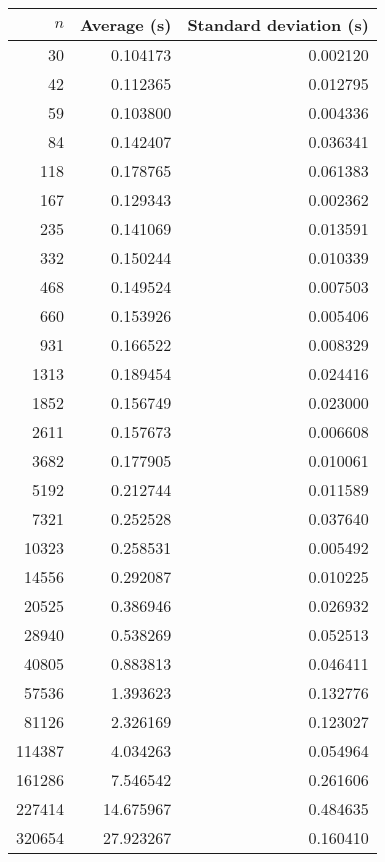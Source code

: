 \begin{tabular}{rrr}
$n$ & Average (s) & Standard deviation (s)\\\hline
30 & 0.104173 & 0.002120\\
42 & 0.112365 & 0.012795\\
59 & 0.103800 & 0.004336\\
84 & 0.142407 & 0.036341\\
118 & 0.178765 & 0.061383\\
167 & 0.129343 & 0.002362\\
235 & 0.141069 & 0.013591\\
332 & 0.150244 & 0.010339\\
468 & 0.149524 & 0.007503\\
660 & 0.153926 & 0.005406\\
931 & 0.166522 & 0.008329\\
1313 & 0.189454 & 0.024416\\
1852 & 0.156749 & 0.023000\\
2611 & 0.157673 & 0.006608\\
3682 & 0.177905 & 0.010061\\
5192 & 0.212744 & 0.011589\\
7321 & 0.252528 & 0.037640\\
10323 & 0.258531 & 0.005492\\
14556 & 0.292087 & 0.010225\\
20525 & 0.386946 & 0.026932\\
28940 & 0.538269 & 0.052513\\
40805 & 0.883813 & 0.046411\\
57536 & 1.393623 & 0.132776\\
81126 & 2.326169 & 0.123027\\
114387 & 4.034263 & 0.054964\\
161286 & 7.546542 & 0.261606\\
227414 & 14.675967 & 0.484635\\
320654 & 27.923267 & 0.160410\\
\end{tabular}

